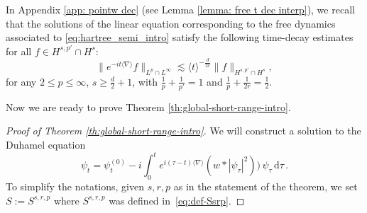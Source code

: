 \documentclass[12pt]{article}
\theoremstyle{plain}
\begin{document}
In Appendix \ref{app: pointw dec} (see Lemma \ref{lemma: free t dec interp}), we recall that the solutions of the linear equation corresponding to the free dynamics associated to \eqref{eq:hartree_semi_intro} satisfy the following time-decay estimates for all $f \in H^{s,p' }\cap H^s$:
	\begin{equation}\label{eq:a3}
		\|e^{-it\langle \nabla \rangle} f\|_{L^{p}\cap L^\infty} \lesssim \langle t\rangle^{ -\frac{d}{2r}}\|f\|_{H^{s,p'}\cap H^s},
	\end{equation}
for any $2\le p \le\infty$, $s\geq \frac d2 +1$, with $\frac1{p}+\frac1{p'}=1$ and $\frac1p+\frac1{2r}=\frac12$.

Now we are ready to prove  Theorem \ref{th:global-short-range-intro}.

\begin{proof}[Proof of Theorem \ref{th:global-short-range-intro}]
We will construct a solution to the Duhamel equation
\begin{equation}\label{eq:Duhamel}
\psi_{t}=\psi^{(0)}_{t}-i\int_{0}^{t}e^{i(\tau-t)\langle\nabla\rangle}(w*|\psi_{\tau}|^{2}))\,\psi_{\tau}\,\mathrm{d}\tau\,.
\end{equation}
To simplify the notations, given $s,r,p$ as in the statement of the theorem, we set $S:=S^{s,r,p}$ where $S^{s,r,p}$ was defined in~\eqref{eq:def-Ssrp}.


\end{proof}
\end{document}
